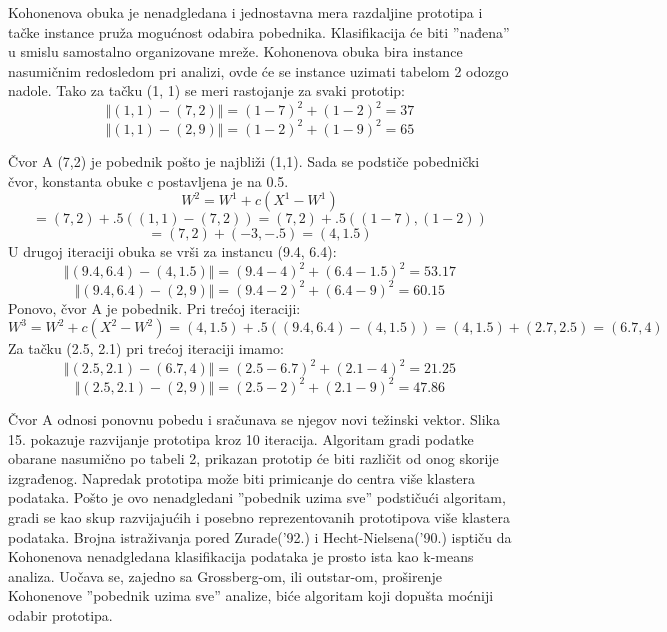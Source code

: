 \documentclass[fontsize=11bp, paper=a4]{scrarticle}
\begin{document}
Kohonenova obuka je nenadgledana i jednostavna mera razdaljine prototipa i tačke instance pruža mogućnost odabira pobednika. Klasifikacija će biti ''nađena'' u smislu samostalno organizovane mreže. Kohonenova obuka bira instance nasumičnim redosledom pri analizi, ovde će se instance uzimati tabelom 2 odozgo nadole. Tako za tačku (1, 1) se meri rastojanje za svaki prototip:
$$
\Vert (1,1) - (7,2) \Vert = (1-7)^2 + (1-2)^2 = 37
$$
$$
\Vert (1,1) - (2,9) \Vert = (1-2)^2 + (1-9)^2 = 65
$$

Čvor A (7,2) je pobednik pošto je najbliži (1,1). Sada se podstiče pobednički čvor, konstanta obuke c postavljena je na 0.5.
$$ W^2 = W^1 + c(X^1 - W^1) $$
$$ = (7, 2) + .5((1, 1) - (7, 2)) = (7, 2) + .5((1 - 7), (1 - 2)) $$
$$ = (7, 2) + (-3, -.5) = (4, 1.5) $$
U drugoj iteraciji obuka se vrši za instancu (9.4, 6.4):
$$ \Vert (9.4, 6.4) - (4, 1.5) \Vert = (9.4 - 4)^2 + (6.4 - 1.5)^2 = 53.17 $$
$$ \Vert (9.4, 6.4) - (2, 9) \Vert = (9.4 - 2)^2 + (6.4 - 9)^2 = 60.15 $$
Ponovo, čvor A je pobednik. Pri trećoj iteraciji:
$$
W^3 = W^2 + c (X^2 - W^2) = (4, 1.5) + .5((9.4, 6.4) - (4, 1.5)) = (4, 1.5) + (2.7, 2.5) = (6.7, 4)
$$
Za tačku (2.5, 2.1) pri trećoj iteraciji imamo:
$$\Vert(2.5, 2.1) - (6.7, 4)\Vert = (2.5 - 6.7)^2 + (2.1 - 4)^2 = 21.25$$
$$\Vert(2.5, 2.1) - (2, 9)\Vert = (2.5 - 2)^2 + (2.1 - 9)^2 = 47.86$$

Čvor A odnosi ponovnu pobedu i sračunava se njegov novi težinski vektor. Slika 15. pokazuje razvijanje prototipa kroz 10 iteracija. Algoritam gradi podatke obarane nasumično po tabeli 2, prikazan prototip će biti različit od onog skorije izgrađenog. Napredak prototipa može biti primicanje do centra više klastera podataka. Pošto je ovo nenadgledani ''pobednik uzima sve'' podstičući algoritam, gradi se kao skup razvijajućih i posebno reprezentovanih prototipova više klastera podataka. Brojna istraživanja pored Zurade('92.) i Hecht-Nielsena('90.) isptiču da Kohonenova nenadgledana klasifikacija podataka je prosto ista kao k-means analiza. Uočava se, zajedno sa Grossberg-om, ili outstar-om, proširenje Kohonenove ''pobednik uzima sve'' analize, biće algoritam koji dopušta moćniji odabir prototipa.
\end{document}
